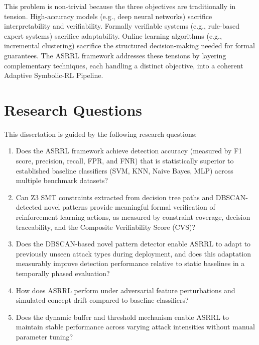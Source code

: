 \documentclass[12pt, letterpaper, oneside]{report}
\newcommand{\ASRRL}{\textsc{ASRRL}}
\begin{document}
This problem is non-trivial because the three objectives are traditionally in tension. High-accuracy models (e.g., deep neural networks) sacrifice interpretability and verifiability. Formally verifiable systems (e.g., rule-based expert systems) sacrifice adaptability. Online learning algorithms (e.g., incremental clustering) sacrifice the structured decision-making needed for formal guarantees. The \ASRRL{} framework addresses these tensions by layering complementary techniques, each handling a distinct objective, into a coherent Adaptive Symbolic-RL Pipeline.


\section{Research Questions}
\label{sec:research_questions}

This dissertation is guided by the following research questions:

\begin{enumerate}[label=\textbf{RQ\arabic*.}]
    \item Does the \ASRRL{} framework achieve detection accuracy (measured by F1 score, precision, recall, FPR, and FNR) that is statistically superior to established baseline classifiers (SVM, KNN, Naive Bayes, MLP) across multiple benchmark datasets?

    \item Can Z3 SMT constraints extracted from decision tree paths and DBSCAN-detected novel patterns provide meaningful formal verification of reinforcement learning actions, as measured by constraint coverage, decision traceability, and the Composite Verifiability Score (CVS)?

    \item Does the DBSCAN-based novel pattern detector enable \ASRRL{} to adapt to previously unseen attack types during deployment, and does this adaptation measurably improve detection performance relative to static baselines in a temporally phased evaluation?

    \item How does \ASRRL{} perform under adversarial feature perturbations and simulated concept drift compared to baseline classifiers?

    \item Does the dynamic buffer and threshold mechanism enable \ASRRL{} to maintain stable performance across varying attack intensities without manual parameter tuning?
\end{enumerate}
\end{document}
